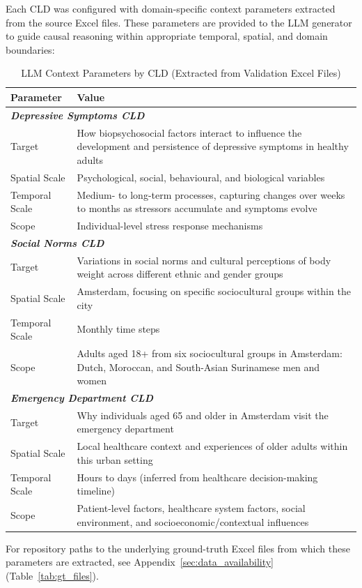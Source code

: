 Each CLD was configured with domain-specific context parameters extracted from the source Excel files. These parameters are provided to the LLM generator to guide causal reasoning within appropriate temporal, spatial, and domain boundaries:

\begin{table}[H]
\centering
\caption[LLM context parameters by CLD]{LLM Context Parameters by CLD (Extracted from Validation Excel Files)}
\label{tab:cld_context}
\footnotesize
\begin{tabularx}{\textwidth}{@{}l X@{}}
\toprule
\textbf{Parameter} & \textbf{Value} \\
\midrule
\multicolumn{2}{l}{\textit{\textbf{Depressive Symptoms CLD}}} \\
Target & How biopsychosocial factors interact to influence the development and persistence of depressive symptoms in healthy adults \\
Spatial Scale & Psychological, social, behavioural, and biological variables \\
Temporal Scale & Medium- to long-term processes, capturing changes over weeks to months as stressors accumulate and symptoms evolve \\
Scope & Individual-level stress response mechanisms \\
\midrule
\multicolumn{2}{l}{\textit{\textbf{Social Norms CLD}}} \\
Target & Variations in social norms and cultural perceptions of body weight across different ethnic and gender groups \\
Spatial Scale & Amsterdam, focusing on specific sociocultural groups within the city \\
Temporal Scale & Monthly time steps \\
Scope & Adults aged 18+ from six sociocultural groups in Amsterdam: Dutch, Moroccan, and South-Asian Surinamese men and women \\
\midrule
\multicolumn{2}{l}{\textit{\textbf{Emergency Department CLD}}} \\
Target & Why individuals aged 65 and older in Amsterdam visit the emergency department \\
Spatial Scale & Local healthcare context and experiences of older adults within this urban setting \\
Temporal Scale & Hours to days (inferred from healthcare decision-making timeline) \\
Scope & Patient-level factors, healthcare system factors, social environment, and socioeconomic/contextual influences \\
\bottomrule
\end{tabularx}
\end{table}
For repository paths to the underlying ground-truth Excel files from which these parameters are extracted, see Appendix~\ref{sec:data_availability} (Table~\ref{tab:gt_files}).

